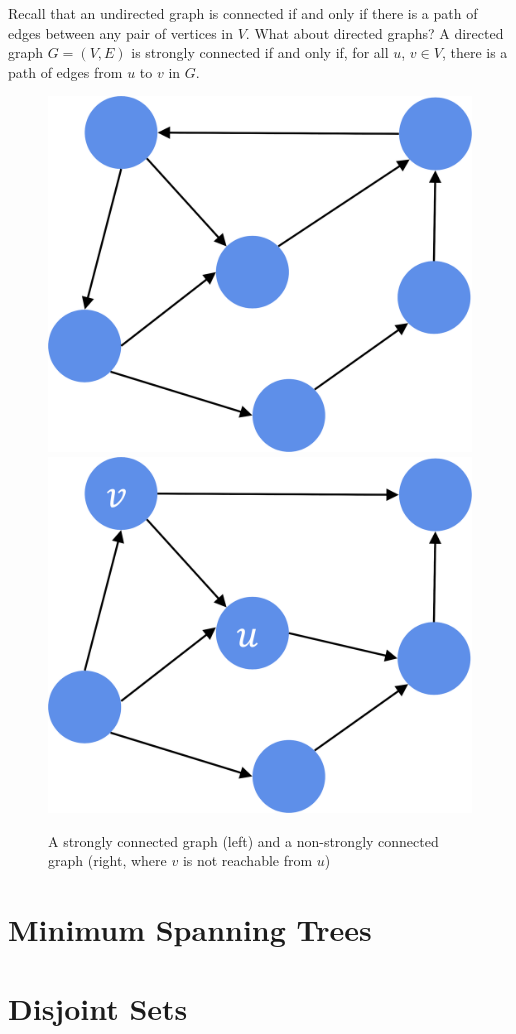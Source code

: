 Recall that an undirected graph is connected if and only if there is a path of edges between any pair of vertices in $V$. What about directed graphs? A directed graph $G = (V, E)$ is strongly connected if and only if, for all $u$, $v \in V$, there is a path of edges from $u$ to $v$ in $G$. 

\begin{figure}[H]
    \centering
    \includegraphics[width=0.2\linewidth]{images/Strongly-Connected.png}
    \qquad
    \includegraphics[width=0.2\linewidth]{images/Not-Strongly-Connected.png}
    \caption*{A strongly connected graph (left) and a non-strongly connected graph (right, where $v$ is not reachable from $u$)}
\end{figure}


\section{Minimum Spanning Trees}

\section{Disjoint Sets}